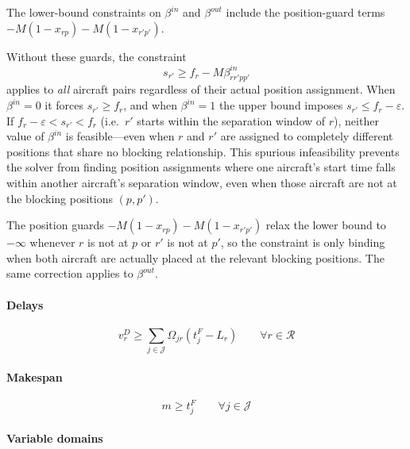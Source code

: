 \begin{remark}
The lower-bound constraints on $\beta^{in}$ and $\beta^{out}$ include the position-guard terms $-M(1-x_{rp})-M(1-x_{r'p'})$.

Without these guards, the constraint
\[
  s_{r'} \ge f_r - M\beta^{in}_{rr'pp'}
\]
applies to \emph{all} aircraft pairs regardless of their actual position assignment.
When $\beta^{in}=0$ it forces $s_{r'} \ge f_r$, and when $\beta^{in}=1$ the upper bound imposes $s_{r'} \le f_r - \varepsilon$.
If $f_r - \varepsilon < s_{r'} < f_r$ (i.e.\ $r'$ starts within the separation window of $r$), neither value of $\beta^{in}$ is feasible—even when $r$ and $r'$ are assigned to completely different positions that share no blocking relationship.
This spurious infeasibility prevents the solver from finding position assignments where one aircraft's start time falls within another aircraft's separation window, even when those aircraft are not at the blocking positions $(p,p')$.

The position guards $-M(1-x_{rp})-M(1-x_{r'p'})$ relax the lower bound to $-\infty$ whenever $r$ is not at $p$ or $r'$ is not at $p'$, so the constraint is only binding when both aircraft are actually placed at the relevant blocking positions.
The same correction applies to $\beta^{out}$.
\end{remark}

\paragraph{Delays}

\begin{equation}
v^{D}_r \ge
\sum_{j \in \mathcal{J}} \Omega_{jr}(t^{F}_j - L_r)
\qquad \forall r \in \mathcal{R}
\end{equation}


\paragraph{Makespan}

\begin{equation}
m \ge t^{F}_j
\qquad \forall j \in \mathcal{J}
\end{equation}

\paragraph{Variable domains}

